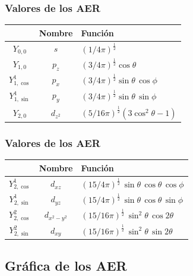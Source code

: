 \documentclass[12pt]{beamer}
\begin{document}
\begin{frame}
\frametitle{Valores de los AER}
\begin{table}[H]
\centering
\renewcommand{\arraystretch}{1.5}
\begin{tabular}{|c | c | l|} \hline
 & Nombre & Función \\ \hline
$Y_{0,0}$ & $s$ & $(1/4 \pi)^{\frac{1}{2}}$ \\ \hline
$Y_{1,0}$ & $p_{z}$ & $(3/4 \pi)^{\frac{1}{2}} \cos \theta$ \\ \hline
$Y_{1, \cos}^{1}$ & $p_{x}$ & $(3/4 \pi)^{\frac{1}{2}} \sin \theta \, \cos \phi$ \\ \hline
$Y_{1, \sin}^{1}$ & $p_{y}$ & $(3/4 \pi)^{\frac{1}{2}} \sin \theta \, \sin \phi$ \\ \hline
$Y_{2, 0}$ & $d_{z^{2}}$ & $(5/16 \pi)^{\frac{1}{2}} (3 \cos^{2} \theta  - 1)$ \\ \hline
\end{tabular}
\end{table}
\end{frame}
\begin{frame}
\frametitle{Valores de los AER}
\begin{table}[H]
\centering
\renewcommand{\arraystretch}{1.5}
\begin{tabular}{|c | c | l|} \hline
& Nombre & Función \\ \hline
$Y_{2, \cos}^{1}$ & $d_{xz}$ & $(15/4 \pi)^{\frac{1}{2}} \, \sin \theta \, \cos \theta \, \cos \phi$ \\ \hline
$Y_{2, \sin}^{1}$ & $d_{yz}$ & $(15/4 \pi)^{\frac{1}{2}} \, \sin \theta \, \cos \theta \, \sin \phi$ \\ \hline
$Y_{2, \cos}^{2}$ & $d_{x^{2}-y^{2}}$ & $(15/16 \pi)^{\frac{1}{2}} \, \sin^{2} \theta \, \cos 2 \theta$ \\ \hline
$Y_{2, \sin}^{2}$ & $d_{xy}$ & $(15/16 \pi)^{\frac{1}{2}} \, \sin^{2} \theta \, \sin 2 \theta$ \\ \hline
\end{tabular}
\end{table}
\end{frame}

\subsection{Gráfica de los AER}
\end{document}
